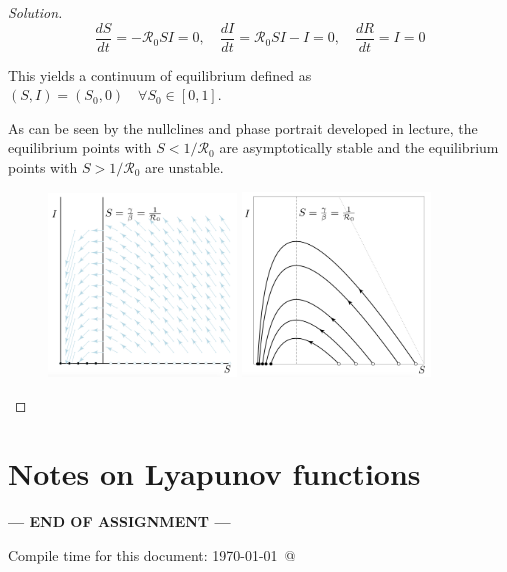 \documentclass[12pt]{article}
\begin{document}
\begin{enumerate}[(a)]
{\begin{proof}[Solution]
	\begin{equation}
	\frac{dS}{dt}=-\mathcal{R}_0 SI=0, \quad \frac{dI}{dt}=\mathcal{R}_0 SI-I=0, \quad \frac{dR}{dt}=I=0
	\end{equation}
	
	This yields a continuum of equilibrium defined as $(S,I)=(S_0,0) \quad \forall S_0 \in [0,1]$.
	
	As can be seen by the nullclines and phase portrait developed in lecture, the equilibrium points with $S<1/\mathcal{R}_0$ are asymptotically stable and the equilibrium points with  $S>1/\mathcal{R}_0$ are unstable.

\begin{figure}[h]
\begin{center}
		\includegraphics[width=5cm]{images/4MB3_A1_2d_nc.png}
		\includegraphics[width=5cm]{images/4MB3_A1_2d_pp.png}
\end{center}
\end{figure}
	
	 
\end{proof}
}

\end{enumerate}

\newpage
\section*{Notes on Lyapunov functions}\hypertarget{NotesLyapFuns}{}

\NotesOnLyapunovFunctions




\bigskip

\centerline{\bf--- END OF ASSIGNMENT ---}

\bigskip
Compile time for this document:
\today\ @ \thistime
\end{document}
